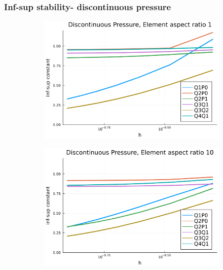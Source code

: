 \documentclass{beamer}
\begin{document}
\begin{frame}
	\frametitle{Inf-sup stability- discontinuous pressure}

	\begin{figure} [H]
		\begin{subfigure}{.5\textwidth}
			\centering
			\includegraphics[width=.9\textwidth]{../figs/dist-p-1.png}
		\end{subfigure}%
		\begin{subfigure}{.5\textwidth}
			\centering
			\includegraphics[width=.9\textwidth]{../figs/dist-p-10.png}
		\end{subfigure}
	\end{figure}
\end{frame}
\end{document}
